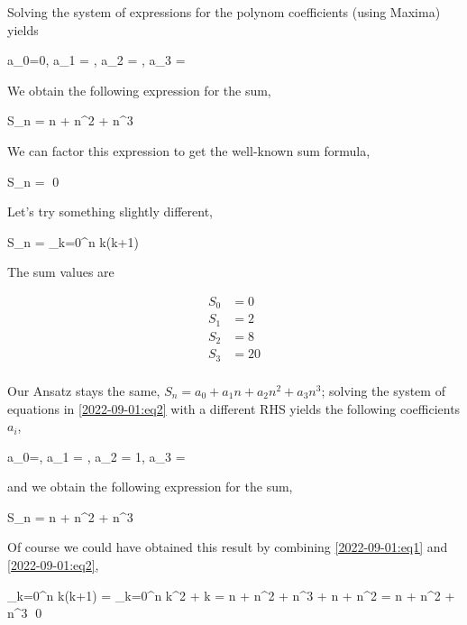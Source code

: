 Solving the system of expressions for the polynom coefficients (using Maxima) yields

\bee
a_0=0, a_1 = , a_2 = , a_3 = 
\eee

We obtain the following expression for the sum,

\be\label{2022-09-01:eq2}
S_n = n + n^2 + n^3
\ee

We can factor this expression to get the well-known sum formula,

\bee
S_n =  \qed
\eee

Let's try something slightly different,

\bee
S_n = \sum_{k=0}^n k(k+1)
\eee

The sum values are

\begin{align*}
  S_0 &= 0 \\
  S_1 &= 2 \\
  S_2 &= 8 \\
  S_3 &= 20 \\
\end{align*}

Our Ansatz stays the same, $S_n = a_0 + a_1 n + a_2 n^2 + a_3 n^3$; solving the system of equations in \eqref{2022-09-01:eq2} with a different RHS yields the following coefficients $a_i$,

\bee
a_0=, a_1 = , a_2 = 1, a_3 = 
\eee

and we obtain the following expression for the sum,

\bee
S_n = n + n^2 + n^3
\eee

Of course we could have obtained this result by combining \eqref{2022-09-01:eq1} and \eqref{2022-09-01:eq2},

\bee
\sum_{k=0}^n k(k+1) = \sum_{k=0}^n k^2 + k = n + n^2 + n^3 + n + n^2 = n + n^2 + n^3 \qed
\eee


